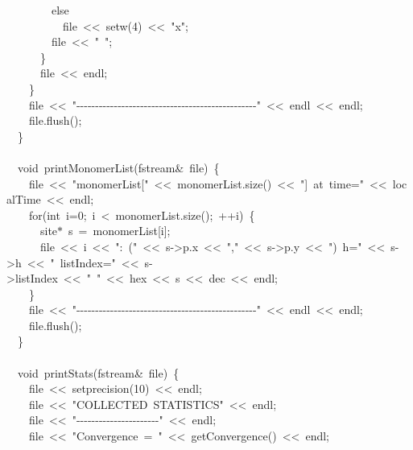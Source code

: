 {\ \ \ \ \ \ \ \ else\\
\ \ \ \ \ \ \ \ \ \ file\ <{}<{}\ setw(4)\ <{}<{}\ "{}x"{};\\
\ \ \ \ \ \ \ \ file\ <{}<{}\ "{}\ "{};\\
\ \ \ \ \ \ \}\\
\ \ \ \ \ \ file\ <{}<{}\ endl;\\
\ \ \ \ \}\\
\ \ \ \ file\ <{}<{}\ "{}-{}-{}-{}-{}-{}-{}-{}-{}-{}-{}-{}-{}-{}-{}-{}-{}-{}-{}-{}-{}-{}-{}-{}-{}-{}-{}-{}-{}-{}-{}-{}-{}-{}-{}-{}-{}-{}-{}-{}-{}-{}-{}-{}-{}-{}-{}-{}-{}"{}\ <{}<{}\ endl\ <{}<{}\ endl;\\
\ \ \ \ file.flush();\\
\ \ \}\\
\ \\
\ \ void\ printMonomerList(fstream\&\ file)\ \{\\
\ \ \ \ file\ <{}<{}\ "{}monomerList["{}\ <{}<{}\ monomerList.size()\ <{}<{}\ "{}]\ at\ time="{}\ <{}<{}\ localTime\ <{}<{}\ endl;\\
\ \ \ \ for(int\ i=0;\ i\ <{}\ monomerList.size();\ ++i)\ \{\\
\ \ \ \ \ \ site$\ast$\ s\ =\ monomerList[i];\\
\ \ \ \ \ \ file\ <{}<{}\ i\ <{}<{}\ "{}:\ ("{}\ <{}<{}\ s-{}>{}p.x\ <{}<{}\ "{},"{}\ <{}<{}\ s-{}>{}p.y\ <{}<{}\ "{})\ h="{}\ <{}<{}\ s-{}>{}h\ <{}<{}\ "{}\ listIndex="{}\ <{}<{}\ s-{}>{}listIndex\ <{}<{}\ "{}\ "{}\ <{}<{}\ hex\ <{}<{}\ s\ <{}<{}\ dec\ <{}<{}\ endl;\\
\ \ \ \ \}\\
\ \ \ \ file\ <{}<{}\ "{}-{}-{}-{}-{}-{}-{}-{}-{}-{}-{}-{}-{}-{}-{}-{}-{}-{}-{}-{}-{}-{}-{}-{}-{}-{}-{}-{}-{}-{}-{}-{}-{}-{}-{}-{}-{}-{}-{}-{}-{}-{}-{}-{}-{}-{}-{}-{}-{}"{}\ <{}<{}\ endl\ <{}<{}\ endl;\\
\ \ \ \ file.flush();\\
\ \ \}\\
\ \\
\ \ void\ printStats(fstream\&\ file)\ \{\\
\ \ \ \ file\ <{}<{}\ setprecision(10)\ <{}<{}\ endl;\\
\ \ \ \ file\ <{}<{}\ "{}COLLECTED\ STATISTICS"{}\ <{}<{}\ endl;\\
\ \ \ \ file\ <{}<{}\ "{}-{}-{}-{}-{}-{}-{}-{}-{}-{}-{}-{}-{}-{}-{}-{}-{}-{}-{}-{}-{}-{}-{}"{}\ <{}<{}\ endl;\\
\ \ \ \ file\ <{}<{}\ "{}Convergence\ =\ "{}\ <{}<{}\ getConvergence()\ <{}<{}\ endl;\\
}
